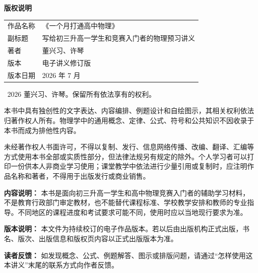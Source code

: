 \clearpage
\thispagestyle{empty}
\vspace*{\fill}

\begin{minipage}{0.88\textwidth}
\raggedright
{\bfseries 版权说明\par}
\vspace{0.8em}

\renewcommand{\arraystretch}{1.25}
\begin{tabular}{@{}p{}p{}@{}}
作品名称 & 《一个月打通高中物理》\\
副标题 & 写给初三升高一学生和竞赛入门者的物理预习讲义\\
著者 & 董兴习、许琴\\
版本 & 电子讲义修订版\\
版本日期 & 2026 年 7 月\\
\end{tabular}

\vspace{1.2em}

\textcopyright\ 2026 董兴习、许琴。保留所有依法享有的权利。

本书中具有独创性的文字表达、内容编排、例题设计和自绘图示，其相关权利依法归著作权人所有。物理学中的通用概念、定律、公式、符号和公共知识不因收录于本书而成为排他性内容。

未经著作权人书面许可，不得以复制、发行、信息网络传播、改编、翻译、汇编等方式使用本书全部或实质性部分，但法律法规另有规定的除外。个人学习者可以打印一份供本人非商业学习使用；课堂教学中依法进行少量引用或复制时，应注明作品名称和著者，不得用于出版发行或商业销售。

\textbf{内容说明：} 本书是面向初三升高一学生和高中物理竞赛入门者的辅助学习材料，不是教育行政部门审定教材，也不能替代课程标准、学校教学安排和教师的专业指导。不同地区的课程进度和考试要求可能不同，使用时应以当地现行要求为准。

\textbf{版本说明：} 本文件为持续校订的电子作品版本。若以后由出版机构正式出版，书名、版次、出版信息和版权页内容以正式出版版本为准。

\textbf{读者反馈：} 如发现概念、公式、例题解答、图示或排版问题，请通过“怎样使用这本讲义”末尾的联系方式向作者反馈。
\end{minipage}

\vspace*{0.08\textheight}
\clearpage

